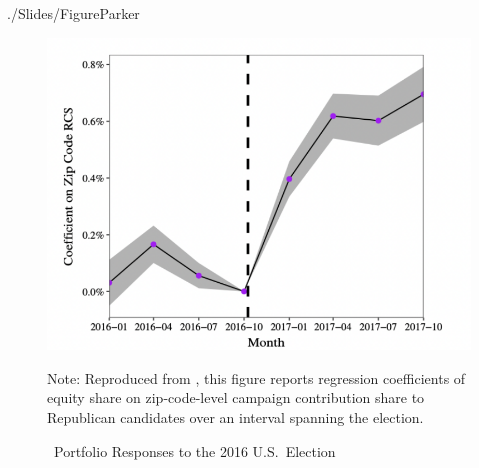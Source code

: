 
\begin{verbatimwrite}{./Slides/FigureParker}
  \begin{figure}[!ht] \centering  %
    \caption{ ~Portfolio Responses to the 2016 U.S.\ Election}
    \label{fig:parker}
    \centerline{\includegraphics[width=\textwidth]{./figures/parker}}
    \begin{flushleft}
      {\footnotesize Note: Reproduced from \cite{meeuwis2018belief}, this figure reports regression coefficients of equity share on zip-code-level campaign contribution share to Republican candidates over an interval spanning the election.}
    \end{flushleft}
  \end{figure}
\end{verbatimwrite}





